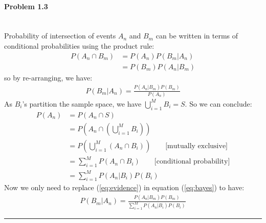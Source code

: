 \documentclass[12pt, letterpaper]{scrartcl}
\begin{document}
\paragraph*{Problem 1.3} \hfill\\
Probability of intersection of events $A_n$ and $B_m$ can be written in terms of conditional probabilities using the product rule:
\begin{align*}
    P(A_n\cap B_m)&=P(A_n)P(B_m|A_n)\\
    &=P(B_m)P(A_n|B_m)
\end{align*}
so by re-arranging, we have:
\begin{align*}
    P(B_m|A_n)=\frac{P(A_n|B_m)P(B_m)}{P(A_n)}
    \tag{$*$}
    \label{eq:bayes}
\end{align*}
As $B_i$'s partition the sample space, we have $\bigcup_{i=1}^MB_i=S$. So we can conclude:
\begin{align*}
    P(A_n)&=P(A_n\cap S)\\
    &=P(A_n\cap (\bigcup_{i=1}^MB_i))\\
    &=P(\bigcup_{i=1}^M(A_n\cap B_i)) \qquad \text{[mutually exclusive]}\\
    &=\sum_{i=1}^MP(A_n\cap B_i)\qquad \text{[conditional probability]}\\
    &=\sum_{i=1}^MP(A_n|B_i)P(B_i)
    \tag{$\dagger$}
    \label{eq:evidence}
\end{align*}
Now we only need to replace (\ref{eq:evidence}) in equation (\ref{eq:bayes}) to have:
\begin{align*}
    P(B_m|A_n)=\frac{P(A_n|B_m)P(B_m)}{\sum_{i=1}^MP(A_n|B_i)P(B_i)}
\end{align*}
\hrule
\end{document}
